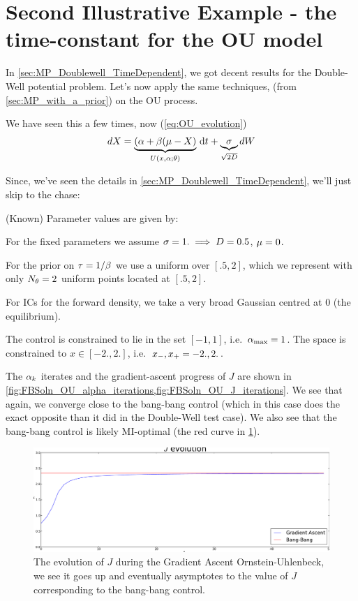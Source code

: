 \clearpage

\section{Second Illustrative Example - the time-constant for the OU model}
\label{sec:MP_OU_TimeDependent}

In \cref{sec:MP_Doublewell_TimeDependent}, we got decent results for the
Double-Well potential problem. Let's now apply the same techniques, (from
\cref{sec:MP_with_a_prior}) on the OU process.

We have seen this a few times, now (\cref{eq:OU_evolution})
$$
dX = \underbrace{(\alpha + \beta( \mu - X)}_{U(x,\alpha; { \theta})} \, \mathrm{d} t +
\underbrace{\sigma}_{\sqrt{2D}} dW
$$

Since, we've seen the details in \cref{sec:MP_Doublewell_TimeDependent}, we'll
just skip to the chase:

(Known) Parameter values are given by: 

For the fixed parameters we assume $\sigma = 1. \implies D = 0.5$, ${\mu } = 0$.

For the prior on ${ \tau } = 1/\beta$ we use a uniform over $[.5,2]$, which we represent
with only $N_{ \theta} = 2$ uniform points located at $[.5,2]$.  

For ICs for the forward density, we take a very broad Gaussian centred at $0$
(the equilibrium).

The control is constrained to lie in the set $[-1 , 1 ]$, i.e.\ ${ \alpha_{\textrm{max}} }
= 1$. The space is constrained to $x \in [-2.,2.]$, i.e.\ ${ x_{-} }, { x_{+} } =
-2.,2.$. 

The $\alpha_k$ iterates and the gradient-ascent progress of $J$ are shown
in \cref{fig:FBSoln_OU_alpha_iterations,fig:FBSoln_OU_J_iterations}. We see that
again, we converge close to the bang-bang control (which in this case does the
exact opposite than it did in the Double-Well test case). We also see that
the bang-bang control is likely MI-optimal (the red curve in
\cref{fig:FBSoln_OU_J_iterations}). 
 
 
\begin{figure}[htp]
\begin{center} 
  \includegraphics[width=.9\textwidth]{Figs/OUFBSolver/FB_J_iterates_uICs.pdf}
  \caption[labelInTOC]{The evolution of $J$ during the Gradient Ascent
  Ornstein-Uhlenbeck, we see it goes up and eventually asymptotes to the value
  of $J$ corresponding to the bang-bang control.}
  \label{fig:FBSoln_OU_J_iterations}
\end{center}
\end{figure}


